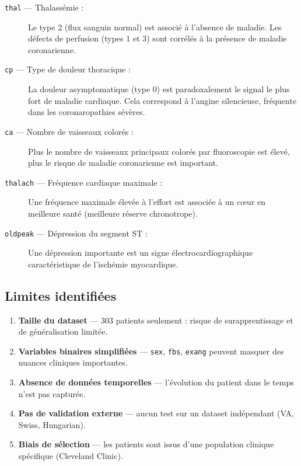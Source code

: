 \documentclass[12pt,a4paper]{article}
\newcommand{\feat}[1]{\texttt{\textcolor{medblue}{#1}}}
\begin{document}
			\begin{description}
				\item[\feat{thal} — Thalassémie :] Le type 2 (flux sanguin normal) est associé à l'absence de maladie. Les défects de perfusion (types 1 et 3) sont corrélés à la présence de maladie coronarienne.
				
				\item[\feat{cp} — Type de douleur thoracique :] La douleur asymptomatique (type 0) est paradoxalement le signal le plus fort de maladie cardiaque. Cela correspond à l'angine silencieuse, fréquente dans les coronaropathies sévères.
				
				\item[\feat{ca} — Nombre de vaisseaux colorés :] Plus le nombre de vaisseaux principaux colorés par fluoroscopie est élevé, plus le risque de maladie coronarienne est important.
				
				\item[\feat{thalach} — Fréquence cardiaque maximale :] Une fréquence maximale élevée à l'effort est associée à un cœur en meilleure santé (meilleure réserve chronotrope).
				
				\item[\feat{oldpeak} — Dépression du segment ST :] Une dépression importante est un signe électrocardiographique caractéristique de l'ischémie myocardique.
			\end{description}
		\subsection{Limites identifiées}
		
			\begin{tcolorbox}[warnbox, title={Limites du projet}]
				\begin{enumerate}
					\item \textbf{Taille du dataset} — 303 patients seulement : risque de surapprentissage et de généralisation limitée.
					\item \textbf{Variables binaires simplifiées} — \feat{sex}, \feat{fbs}, \feat{exang} peuvent masquer des nuances cliniques importantes.
					\item \textbf{Absence de données temporelles} — l'évolution du patient dans le temps n'est pas capturée.
					\item \textbf{Pas de validation externe} — aucun test sur un dataset indépendant (VA, Swiss, Hungarian).
					\item \textbf{Biais de sélection} — les patients sont issus d'une population clinique spécifique (Cleveland Clinic).
				\end{enumerate}
			\end{tcolorbox}
			
\end{document}
